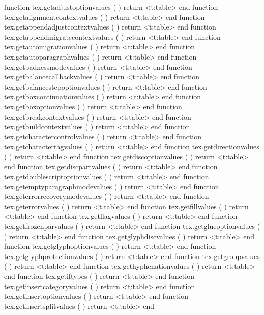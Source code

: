 
\starttyping[option=LUA]
function tex.getadjustoptionvalues         ( ) return <t:table> end
function tex.getalignmentcontextvalues     ( ) return <t:table> end
function tex.getappendadjustcontextvalues  ( ) return <t:table> end
function tex.getappendmigratecontextvalues ( ) return <t:table> end
function tex.getautomigrationvalues        ( ) return <t:table> end
function tex.getautoparagraphvalues        ( ) return <t:table> end
function tex.getbadnessmodevalues          ( ) return <t:table> end
function tex.getbalancecallbackvalues      ( ) return <t:table> end
function tex.getbalancestepoptionvalues    ( ) return <t:table> end
function tex.getboxcontinuationvalues      ( ) return <t:table> end
function tex.getboxoptionvalues            ( ) return <t:table> end
function tex.getbreakcontextvalues         ( ) return <t:table> end
function tex.getbuildcontextvalues         ( ) return <t:table> end
function tex.getcharactercontrolvalues     ( ) return <t:table> end
function tex.getcharactertagvalues         ( ) return <t:table> end
function tex.getdirectionvalues            ( ) return <t:table> end
function tex.getdiscoptionvalues           ( ) return <t:table> end
function tex.getdiscpartvalues             ( ) return <t:table> end
function tex.getdoublescriptoptionvalues   ( ) return <t:table> end
function tex.getemptyparagraphmodevalues   ( ) return <t:table> end
function tex.geterrorrecoverymodevalues    ( ) return <t:table> end
function tex.geterrorvalues                ( ) return <t:table> end
function tex.getfillvalues                 ( ) return <t:table> end
function tex.getflagvalues                 ( ) return <t:table> end
function tex.getfrozenparvalues            ( ) return <t:table> end
function tex.getglueoptionvalues           ( ) return <t:table> end
function tex.getglyphdiscvalues            ( ) return <t:table> end
function tex.getglyphoptionvalues          ( ) return <t:table> end
function tex.getglyphprotectionvalues      ( ) return <t:table> end
function tex.getgroupvalues                ( ) return <t:table> end
function tex.gethyphenationvalues          ( ) return <t:table> end
function tex.getiftypes                    ( ) return <t:table> end
function tex.getinsertcategoryvalues       ( ) return <t:table> end
function tex.getinsertoptionvalues         ( ) return <t:table> end
function tex.getinsertsplitvalues          ( ) return <t:table> end
